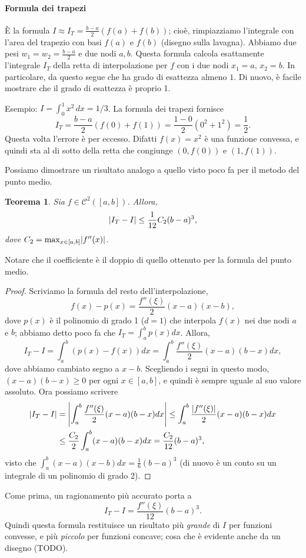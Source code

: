\documentclass[a4paper]{report}
\DeclarePairedDelimiter{\abs}{\lvert}{\rvert}
\newtheorem{theorem}{Teorema}[chapter]
\theoremstyle{definiton}
\theoremstyle{remark}
\begin{document}
\paragraph{Formula dei trapezi}

È la formula $I \approx I_T = \frac{b-a}{2}(f(a)+f(b))$; cioè, rimpiazziamo l'integrale con l'area del trapezio con basi $f(a)$ e $f(b)$ (disegno sulla lavagna). Abbiamo due pesi $w_1=w_2=\frac{b-a}{2}$ e due nodi $a,b$. Questa formula calcola esattamente l'integrale $I_T$ della retta di interpolazione per $f$ con i due nodi $x_1=a$, $x_2=b$. In particolare, da questo segue che ha grado di esattezza almeno $1$. Di nuovo, è facile mostrare che il grado di esattezza è proprio 1.

Esempio: $I = \int_0^1 x^2\, dx = 1/3$. La formula dei trapezi fornisce
\[
    I_T = \frac{b-a}{2}(f(0)+f(1)) = \frac{1-0}{2}(0^2+1^2) = \frac{1}{2}.
\]
Questa volta l'errore è per eccesso. Difatti $f(x)=x^2$ è una funzione convessa, e quindi sta al di sotto della retta che congiunge $(0,f(0))$ e $(1,f(1))$.

Possiamo dimostrare un risultato analogo a quello visto poco fa per il metodo del punto medio.
\begin{theorem}
Sia $f\in\mathcal{C}^2([a,b])$. Allora,
\[
\abs{I_T-I} \leq \frac{1}{12}C_2 (b-a)^3,
\]
dove $C_2 = \max_{x\in [a,b]} \abs{f''(x)}$.
\end{theorem}
Notare che il coefficiente è il doppio di quello ottenuto per la formula del punto medio.
\begin{proof}
Scriviamo la formula del resto dell'interpolazione,
\[
f(x) - p(x) = \frac{f''(\xi)}{2}(x-a)(x-b),
\]
dove $p(x)$ è il polinomio di grado 1 ($d=1$) che interpola $f(x)$ nei due nodi $a$ e $b$; abbiamo detto poco fa che $I_T = \int_a^b p(x) dx$. Allora,
\[
I_T - I = \int_a^b (p(x)-f(x)) dx = \int_a^b \frac{f''(\xi)}{2}(x-a)(b-x) dx,
\]
dove abbiamo cambiato segno a $x-b$. Scegliendo i segni in questo modo, $(x-a)(b-x)\geq 0$ per ogni $x\in [a,b]$, e quindi è sempre uguale al suo valore assoluto. Ora possiamo scrivere
\begin{align*}
\abs{I_T - I} &= \abs*{\int_a^b \frac{f''(\xi)}{2}(x-a)(b-x) dx} \leq \int_a^b \frac{\abs{f''(\xi)}}{2}(x-a)(b-x) dx \\
& \leq \frac{C_2}{2} \int_a^b (x-a)(b-x)dx = \frac{C_2}{12}(b-a)^3,
\end{align*}
visto che $\int_a^b (x-a)(x-b)dx = \frac{1}{6}(b-a)^3$ (di nuovo è un conto su un integrale di un polinomio di grado 2).
\end{proof}
Come prima, un ragionamento più accurato porta a
\[
I_T - I = \frac{f''(\xi)}{12}(b-a)^3.
\]
Quindi questa formula restituisce un risultato più \emph{grande} di $I$ per funzioni convesse, e più \emph{piccolo} per funzioni concave; cosa che è evidente anche da un disegno (TODO).
\end{document}
